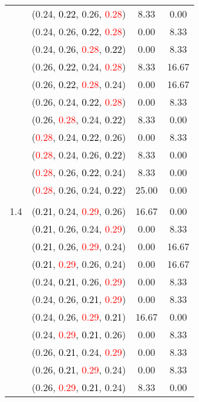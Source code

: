 \documentclass[10pt,a4paper]{report}
\begin{document}
\begin{center}
\begin{longtable}{clcc}
			&(0.24, \textcolor{black}{0.22}, 0.26, \textcolor{red}{0.28})&8.33&0.00\\
			&(0.24, 0.26, \textcolor{black}{0.22}, \textcolor{red}{0.28})&0.00&8.33\\
			&(0.24, 0.26, \textcolor{red}{0.28}, \textcolor{black}{0.22})&0.00&8.33\\
			&(0.26, \textcolor{black}{0.22}, 0.24, \textcolor{red}{0.28})&8.33&16.67\\
			&(0.26, \textcolor{black}{0.22}, \textcolor{red}{0.28}, 0.24)&0.00&16.67\\
			&(0.26, 0.24, \textcolor{black}{0.22}, \textcolor{red}{0.28})&0.00&8.33\\
			&(0.26, \textcolor{red}{0.28}, 0.24, \textcolor{black}{0.22})&8.33&0.00\\
			&(\textcolor{red}{0.28}, 0.24, \textcolor{black}{0.22}, 0.26)&0.00&8.33\\
			&(\textcolor{red}{0.28}, 0.24, 0.26, \textcolor{black}{0.22})&8.33&0.00\\
			&(\textcolor{red}{0.28}, 0.26, \textcolor{black}{0.22}, 0.24)&8.33&0.00\\
			&(\textcolor{red}{0.28}, 0.26, 0.24, \textcolor{black}{0.22})&25.00&0.00\\
		&&&\\
		1.4			&(\textcolor{black}{0.21}, 0.24, \textcolor{red}{0.29}, 0.26)&16.67&0.00\\
			&(\textcolor{black}{0.21}, 0.26, 0.24, \textcolor{red}{0.29})&0.00&8.33\\
			&(\textcolor{black}{0.21}, 0.26, \textcolor{red}{0.29}, 0.24)&0.00&16.67\\
			&(\textcolor{black}{0.21}, \textcolor{red}{0.29}, 0.26, 0.24)&0.00&16.67\\
			&(0.24, \textcolor{black}{0.21}, 0.26, \textcolor{red}{0.29})&0.00&8.33\\
			&(0.24, 0.26, \textcolor{black}{0.21}, \textcolor{red}{0.29})&0.00&8.33\\
			&(0.24, 0.26, \textcolor{red}{0.29}, \textcolor{black}{0.21})&16.67&0.00\\
			&(0.24, \textcolor{red}{0.29}, \textcolor{black}{0.21}, 0.26)&0.00&8.33\\
			&(0.26, \textcolor{black}{0.21}, 0.24, \textcolor{red}{0.29})&0.00&8.33\\
			&(0.26, \textcolor{black}{0.21}, \textcolor{red}{0.29}, 0.24)&0.00&8.33\\
			&(0.26, \textcolor{red}{0.29}, \textcolor{black}{0.21}, 0.24)&8.33&0.00\\

\end{longtable}
\end{center}
\end{document}

